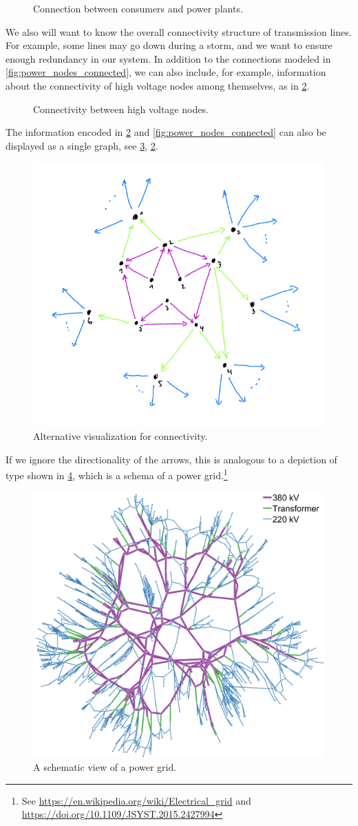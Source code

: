 \begin{figure}[h!]
\centering
{}
 \caption{Connection between consumers and power plants.}
\label{fig:power_paths}
\end{figure}


We also will want to know the overall connectivity structure of transmission lines. For example, some lines may go down during a storm, and we want to ensure enough redundancy in our system. In addition to the connections modeled in \cref{fig:power_nodes_connected}, we can also include, for example, information about the connectivity of high voltage nodes among themselves, as in \cref{fig:power_internodal}.

\begin{figure}[h!]
\centering
 \caption{Connectivity between high voltage nodes.}
\label{fig:power_internodal}
\end{figure}
The information encoded in \cref{fig:power_internodal} and \cref{fig:power_nodes_connected} can also be displayed as a single graph, see \cref{fig:power_graph},
\cref{fig:power_internodal}.
\begin{figure}[h!]
\centering
 \includegraphics[width=0.5\linewidth]{pics/dist_net_6.png}
 \caption{Alternative visualization for connectivity.}
\label{fig:power_graph}
\end{figure}
If we ignore the directionality of the arrows, this is analogous to a depiction of type shown in \cref{fig:power_schema}, which is a schema of a power grid.\footnote{See \url{https://en.wikipedia.org/wiki/Electrical_grid} and \url{https://doi.org/10.1109/JSYST.2015.2427994}}

\begin{figure}[h!]
\centering
 \includegraphics[width=0.5\linewidth]{pics/power_dist_network.png}
 \caption{A schematic view of a power grid.}
\label{fig:power_schema}
\end{figure}




